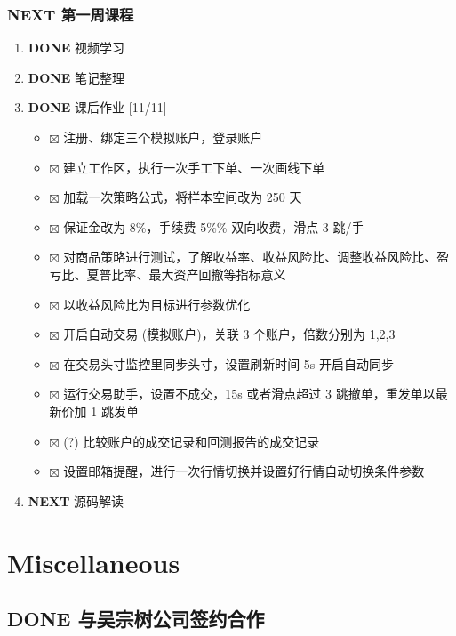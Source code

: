 \documentclass[11pt]{article}
\begin{document}
\subsubsection{{\bfseries\sffamily NEXT} 第一周课程}
\label{sec:orgheadline16}
\begin{enumerate}
\item {\bfseries\sffamily DONE} 视频学习
\label{sec:orgheadline12}
\item {\bfseries\sffamily DONE} 笔记整理
\label{sec:orgheadline13}
\item {\bfseries\sffamily DONE} 课后作业 [11/11]
\label{sec:orgheadline14}
\begin{itemize}
\item $\boxtimes$ 注册、绑定三个模拟账户，登录账户
\item $\boxtimes$ 建立工作区，执行一次手工下单、一次画线下单
\item $\boxtimes$ 加载一次策略公式，将样本空间改为 250 天
\item $\boxtimes$ 保证金改为 8\%，手续费 5\%\% 双向收费，滑点 3 跳/手
\item $\boxtimes$ 对商品策略进行测试，了解收益率、收益风险比、调整收益风险比、盈亏比、夏普比率、最大资产回撤等指标意义
\item $\boxtimes$ 以收益风险比为目标进行参数优化
\item $\boxtimes$ 开启自动交易 (模拟账户)，关联 3 个账户，倍数分别为 1,2,3
\item $\boxtimes$ 在交易头寸监控里同步头寸，设置刷新时间 5s 开启自动同步
\item $\boxtimes$ 运行交易助手，设置不成交，15s 或者滑点超过 3 跳撤单，重发单以最新价加 1 跳发单
\item $\boxtimes$ (?) 比较账户的成交记录和回测报告的成交记录
\item $\boxtimes$ 设置邮箱提醒，进行一次行情切换并设置好行情自动切换条件参数
\end{itemize}
\item {\bfseries\sffamily NEXT} 源码解读
\label{sec:orgheadline15}
\end{enumerate}

\section{Miscellaneous}
\label{sec:orgheadline25}
\subsection{{\bfseries\sffamily DONE} 与吴宗树公司签约合作}
\label{sec:orgheadline19}
\end{document}
